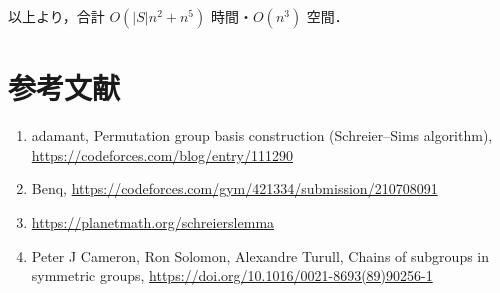 \documentclass{jsarticle}
\newcommand{\abs}[1]{\lvert #1 \rvert}
\begin{document}
以上より，合計 $O(\abs{S} n^2 + n^5)$ 時間・$O(n^3)$ 空間．


\section{参考文献}
\begin{enumerate}\renewcommand{\labelenumi}{[\arabic{enumi}]}
  \item adamant,
    Permutation group basis construction (Schreier–Sims algorithm),
    \url{https://codeforces.com/blog/entry/111290}
  \item Benq,
    \url{https://codeforces.com/gym/421334/submission/210708091}
  \item \url{https://planetmath.org/schreierslemma}
  \item Peter J Cameron, Ron Solomon, Alexandre Turull,
    Chains of subgroups in symmetric groups,
    \url{https://doi.org/10.1016/0021-8693(89)90256-1}
\end{enumerate}
\end{document}
